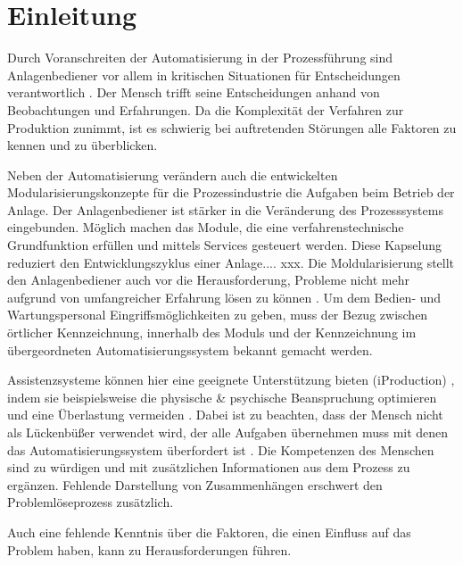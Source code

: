
\chapter{Einleitung}
\label{sec:Einleitung}

Durch Voranschreiten der Automatisierung in der Prozessführung sind Anlagenbediener vor allem in kritischen Situationen für Entscheidungen verantwortlich \cite{Bainbridge1983}. Der Mensch trifft seine Entscheidungen anhand von Beobachtungen und Erfahrungen. Da die Komplexität der Verfahren zur Produktion zunimmt, ist es schwierig bei auftretenden Störungen alle Faktoren zu kennen und zu überblicken. 

Neben der Automatisierung verändern auch die entwickelten Modularisierungskonzepte für die Prozessindustrie die Aufgaben beim Betrieb der Anlage. Der Anlagenbediener ist stärker in die Veränderung des Prozesssystems eingebunden. Möglich machen das Module, die eine verfahrenstechnische Grundfunktion erfüllen und mittels Services gesteuert werden. Diese Kapselung reduziert den Entwicklungszyklus einer Anlage.... xxx. Die Moldularisierung stellt den Anlagenbediener auch vor die Herausforderung, Probleme nicht mehr aufgrund von umfangreicher Erfahrung lösen zu können \cite{}. \glqq Um dem Bedien- und Wartungspersonal Eingriffsmöglichkeiten zu geben, muss der Bezug zwischen örtlicher Kennzeichnung, innerhalb des Moduls und der Kennzeichnung im übergeordneten Automatisierungssystem bekannt gemacht werden.\grqq \ \cite{Obst2013}

Assistenzsysteme können hier eine geeignete Unterstützung bieten \cite{Dalgleish2007} (iProduction) , indem sie beispielsweise die physische \& psychische Beanspruchung optimieren und eine Überlastung vermeiden \cite{Weisner2018}. Dabei ist zu beachten, dass der Mensch nicht als Lückenbüßer verwendet wird, der alle Aufgaben übernehmen muss mit denen das Automatisierungssystem überfordert ist \cite{Weisner2018}. Die Kompetenzen des Menschen sind zu würdigen und mit zusätzlichen Informationen aus dem Prozess zu ergänzen. Fehlende Darstellung von Zusammenhängen erschwert den Problemlöseprozess zusätzlich.

Auch eine fehlende Kenntnis über die Faktoren, die einen Einfluss auf das Problem haben, kann zu Herausforderungen führen.

